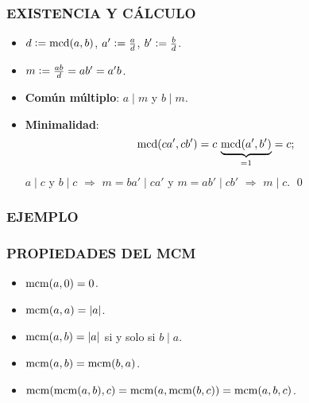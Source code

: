 \begin{frame}
  \frametitle{EXISTENCIA Y CÁLCULO}



  \begin{itemize}
  \item<4-> $d \mathrel{\mathop:}= \operatorname{mcd} (a,b)$, $a' \mathrel{\mathop:}= \frac{a}{d}$, $b' \mathrel{\mathop:}= \frac{b}{d}$.

  \item<5-> $m \mathrel{\mathop:}= \frac{ab}{d} = ab' = a'b$.

  \item<6-> \textbf{Común múltiplo}: $a\mid m$ y $b\mid m$.

  \item<7-> \textbf{Minimalidad}:
    $$\operatorname{mcd} (ca', cb') = c\,\underbrace{\operatorname{mcd} (a',b')}_{= 1} = c;$$
    $a\mid c$ y $b\mid c$ $\Longrightarrow$
    $m = ba' \mid ca'$ y $m = ab' \mid cb'$ $\Longrightarrow$
    $m \mid c$. \qed
  \end{itemize}
\end{frame}

\begin{frame}
  \frametitle{EJEMPLO}


 
\end{frame}

\begin{frame}
  \frametitle{PROPIEDADES DEL MCM}

  \begin{itemize}
  \item<2-> $\operatorname{mcm} (a,0) = 0$.

  \item<3-> $\operatorname{mcm} (a,a) = |a|$.

  \item<4-> $\operatorname{mcm} (a,b) = |a|$ si y solo si $b\mid a$.

  \item<5-> $\operatorname{mcm} (a,b) = \operatorname{mcm} (b,a)$.

  \item<6-> $\operatorname{mcm} (\operatorname{mcm} (a,b), c) = \operatorname{mcm} (a, \operatorname{mcm} (b,c)) = \operatorname{mcm} (a,b,c)$.
  \end{itemize}

\end{frame}

